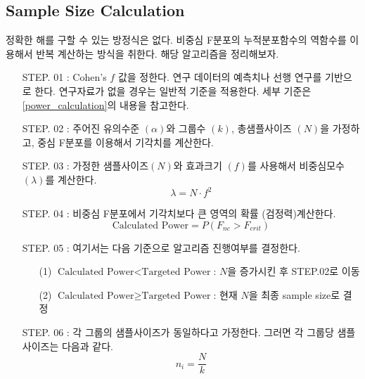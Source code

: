\subsection{Sample Size Calculation}
정확한 해를 구할 수 있는 방정식은 없다. 비중심 F분포의 누적분포함수의 역함수를 이용해서 반복 계산하는 방식을 취한다. 해당 알고리즘을 정리해보자. 
\begin{tcolorbox}[arc=4 mm, colback=green!5, colframe=black, boxrule=0.1 mm, breakable]
    \begin{itemize}[leftmargin = 5.5 em]
        \item[STEP. 01]  : Cohen's $f$ 값을 정한다. 연구 데이터의 예측치나 선행 연구를 기반으로 한다. 연구자료가 없을 경우는 일반적 기준을 적용한다. 세부 기준은 \ref{power_calculation}의 내용을 참고한다. 
        \item[STEP. 02]  : 주어진 유의수준 $(\alpha)$와 그룹수 $(k)$, 총샘플사이즈 $(N)$을 가정하고, 중심 F분포를 이용해서 기각치를 계산한다. 
        \item[STEP. 03]  : 가정한 샘플사이즈$(N)$와 효과크기 $(f)$를 사용해서 비중심모수 $(\lambda)$를 계산한다. 
            \begin{equation*}
                \lambda = N\cdot f^2
            \end{equation*}
        \item[STEP. 04] : 비중심 F분포에서 기각치보다 큰 영역의 확률 (검정력)계산한다. 
            \begin{equation*}
                \text{Calculated Power} = P(F_{nc} > F_{crit})
            \end{equation*}
        \item[STEP. 05]  : 여기서는 다음 기준으로 알고리즘 진행여부를 결정한다. 
            \begin{itemize}[nosep]
                \item [(1)] $\text{Calculated Power} < \text{Targeted Power}$: $N$을 증가시킨 후 STEP.02로 이동
                \item [(2)] $\text{Calculated Power} \geq \text{Targeted Power}$: 현재 $N$을 최종 sample size로 결정
            \end{itemize}
        \item[STEP. 06]  : 각 그룹의 샘플사이즈가 동일하다고 가정한다. 그러면 각 그룹당 샘플 사이즈는 다음과 같다. 
            \begin{equation*}
                n_i = \frac{N}{k}
            \end{equation*}
    \end{itemize}
\end{tcolorbox}
